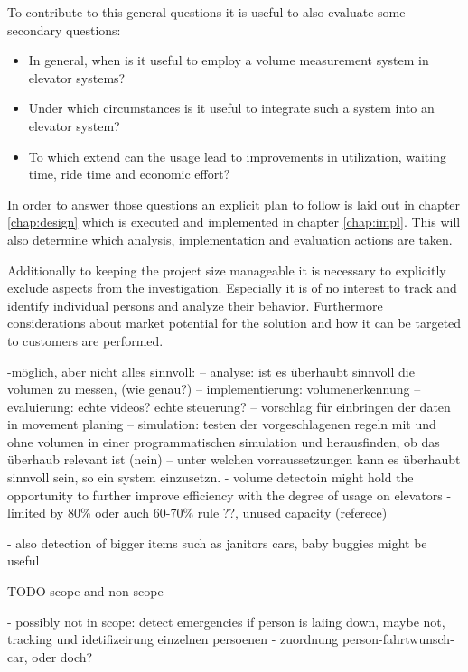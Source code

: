 To contribute to this general questions it is useful to also evaluate some secondary questions:

\begin{itemize}
    \item In general, when is it useful to employ a volume measurement system in elevator systems? 
    \item Under which circumstances is it useful to integrate such a system into an elevator system?
    \item To which extend can the usage lead to improvements in utilization, waiting time, ride time and economic effort?
\end{itemize}

In order to answer those questions an explicit plan to follow is laid out in chapter \ref{chap:design} which is executed and implemented in chapter \ref{chap:impl}. 
This will also determine which analysis, implementation and evaluation actions are taken.

Additionally to keeping the project size manageable it is necessary to explicitly exclude aspects from the  investigation. 
Especially it is of no interest to track and identify individual persons and analyze their behavior.
Furthermore considerations about market potential for the solution and how it can be targeted to customers are performed. 

-möglich, aber nicht alles sinnvoll: 
-- analyse: ist es überhaubt sinnvoll die volumen zu messen, (wie genau?)
-- implementierung: volumenerkennung
-- evaluierung: echte videos? echte steuerung?
-- vorschlag für einbringen der daten in movement planing
-- simulation: testen der vorgeschlagenen regeln mit und ohne volumen in einer programmatischen simulation und herausfinden, ob das überhaub relevant ist (nein)
-- unter welchen vorraussetzungen kann es überhaubt sinnvoll sein, so ein system einzusetzn.
- volume detectoin might hold the opportunity to further improve efficiency with the degree of usage on elevators
- limited by 80\% oder auch 60-70\% rule \autocite[][p.~194]{unger2015aufzuege} ??, unused capacity (referece)
 
- also detection of bigger items such as janitors cars, baby buggies  might be useful

TODO scope and non-scope

- possibly not in scope: detect emergencies if person is laiing down, maybe not, tracking und idetifizeirung einzelnen persoenen
- zuordnung person-fahrtwunsch-car, oder doch?


